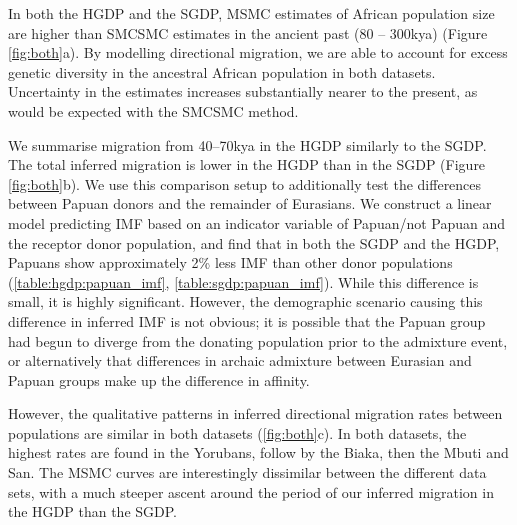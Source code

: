In both the HGDP and the SGDP, MSMC estimates of African population size are higher than SMCSMC estimates in the ancient past (80 -- 300kya) (Figure \ref{fig:both}a). By modelling directional migration, we are able to account for excess genetic diversity in the ancestral African population in both datasets. Uncertainty in the estimates increases substantially nearer to the present, as would be expected with the SMCSMC method. 

We summarise migration from 40--70kya in the HGDP similarly to the SGDP. The total inferred migration is lower in the HGDP than in the SGDP (Figure \autoref{fig:both}b). We use this comparison setup to additionally test the differences between Papuan donors and the remainder of Eurasians. We construct a linear model predicting IMF based on an indicator variable of Papuan/not Papuan and the receptor donor population, and find that in both the SGDP and the HGDP, Papuans show approximately 2\% less IMF than other donor populations (\autoref{table:hgdp:papuan_imf}, \autoref{table:sgdp:papuan_imf}). While this difference is small, it is highly significant. However, the demographic scenario causing this difference in inferred IMF is not obvious; it is possible that the Papuan group had begun to diverge from the donating population prior to the admixture event, or alternatively that differences in archaic admixture between Eurasian and Papuan groups make up the difference in affinity. 



However, the qualitative patterns in inferred directional migration rates between populations are similar in both datasets (\autoref{fig:both}c). In both datasets, the highest rates are found in the Yorubans, follow by the Biaka, then the Mbuti and San. The MSMC curves are interestingly dissimilar between the different data sets, with a much steeper ascent around the period of our inferred migration in the HGDP than the SGDP. 




